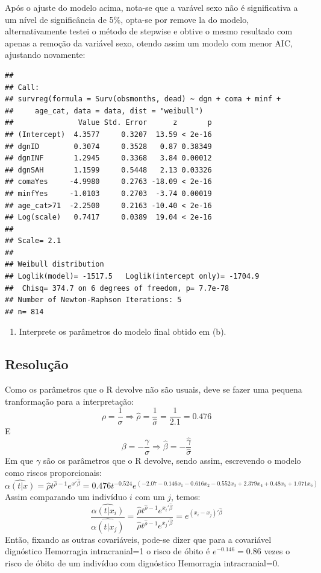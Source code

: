 \documentclass[]{article}
\providecommand{\tightlist}{%
  \setlength{\itemsep}{0pt}\setlength{\parskip}{0pt}}
\begin{document}
Após o ajuste do modelo acima, nota-se que a varável sexo não é
significativa a um nível de significância de 5\%, opta-se por remove la
do modelo, alternativamente testei o método de stepwise e obtive o mesmo
resultado com apenas a remoção da variável sexo, otendo assim um modelo
com menor AIC, ajustando novamente:

\begin{verbatim}
## 
## Call:
## survreg(formula = Surv(obsmonths, dead) ~ dgn + coma + minf + 
##     age_cat, data = data, dist = "weibull")
##               Value Std. Error      z       p
## (Intercept)  4.3577     0.3207  13.59 < 2e-16
## dgnID        0.3074     0.3528   0.87 0.38349
## dgnINF       1.2945     0.3368   3.84 0.00012
## dgnSAH       1.1599     0.5448   2.13 0.03326
## comaYes     -4.9980     0.2763 -18.09 < 2e-16
## minfYes     -1.0103     0.2703  -3.74 0.00019
## age_cat>71  -2.2500     0.2163 -10.40 < 2e-16
## Log(scale)   0.7417     0.0389  19.04 < 2e-16
## 
## Scale= 2.1 
## 
## Weibull distribution
## Loglik(model)= -1517.5   Loglik(intercept only)= -1704.9
##  Chisq= 374.7 on 6 degrees of freedom, p= 7.7e-78 
## Number of Newton-Raphson Iterations: 5 
## n= 814
\end{verbatim}

\newpage

\begin{enumerate}
\def\labelenumi{(\alph{enumi})}
\setcounter{enumi}{2}
\tightlist
\item
  Interprete os parâmetros do modelo final obtido em (b).
\end{enumerate}

\subsection{Resolução}\label{resolucao-2}

Como os parâmetros que o R devolve não são usuais, deve se fazer uma
pequena tranformação para a interpretação:
\[\rho=\frac{1}{\sigma} \Rightarrow \hat{\rho}=\frac{1}{\hat{\sigma}}=\frac{1}{2.1}=0.476\]
E
\[\beta=-\frac{\gamma}{\sigma} \Rightarrow \hat\beta=-\frac{\hat\gamma}{\hat\sigma}\]
Em que \(\gamma\) são os parâmetros que o R devolve, sendo assim,
escrevendo o modelo como riscos proporcionais:
\[\widehat{\alpha(t|x)}=\hat{\rho}t^{\hat{\rho}-1}e^{x'\hat{\beta}}=0.476t^{-0.524}e^{(-2.07 -0.146x_1 -0.616x_2 -0.552x_3 +2.379x_4 +0.48x_5 + 1.071x_6)}\]
Assim comparando um indivíduo \(i\) com um \(j\), temos:
\[\frac{\widehat{\alpha(t|x_i)}}{\widehat{\alpha(t|x_j)}}=\frac{\hat{\rho}t^{\hat{\rho}-1}e^{x_i'\hat{\beta}}}{\hat{\rho}t^{\hat{\rho}-1}e^{x_j'\hat{\beta}}}=e^{(x_i-x_j)'\hat\beta}\]
Então, fixando as outras covariáveis, pode-se dizer que para a
covariável dignóstico Hemorragia intracranial=1 o risco de óbito é
\(e^{-0.146}=0.86\) vezes o risco de óbito de um indivíduo com
dignóstico Hemorragia intracranial=0.
\end{document}
